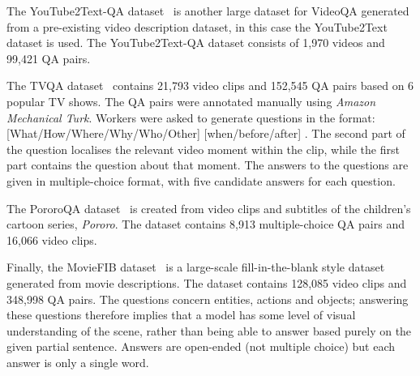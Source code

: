 \documentclass[../interim.tex]{subfiles}
\begin{document}
The YouTube2Text-QA dataset~\cite{dataset:youtube2text-qa} is another large dataset for VideoQA generated from a pre-existing video description dataset, in this case the YouTube2Text~\cite{dataset:youtube2text} dataset is used. The YouTube2Text-QA dataset consists of 1,970 videos and 99,421 QA pairs.

The TVQA dataset~\cite{dataset:tvqa} contains 21,793 video clips and 152,545 QA pairs based on 6 popular TV shows. The QA pairs were annotated manually using \textit{Amazon Mechanical Turk}. Workers were asked to generate questions in the format: [What/How/Where/Why/Who/Other] \underline{\hspace{1cm}} [when/before/after] \underline{\hspace{1cm}}. The second part of the question localises the relevant video moment within the clip, while the first part contains the question about that moment. The answers to the questions are given in multiple-choice format, with five candidate answers for each question.

The PororoQA dataset~\cite{dataset:pororo-qa} is created from video clips and subtitles of the children's cartoon series, \textit{Pororo}. The dataset contains 8,913 multiple-choice QA pairs and 16,066 video clips.

Finally, the MovieFIB dataset~\cite{dataset:movie-fib} is a large-scale fill-in-the-blank style dataset generated from movie descriptions. The dataset contains 128,085 video clips and 348,998 QA pairs. The questions concern entities, actions and objects; answering these questions therefore implies that a model has some level of visual understanding of the scene, rather than being able to answer based purely on the given partial sentence. Answers are open-ended (not multiple choice) but each answer is only a single word.
\end{document}
